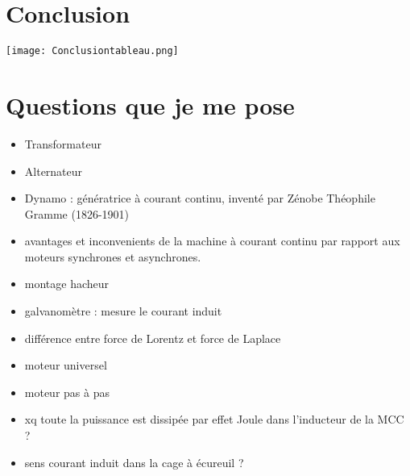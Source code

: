 \documentclass{article}
\begin{document}
\section*{Conclusion}

\begin{center}
    \texttt{[image: Conclusiontableau.png]}
\end{center}

\section*{Questions que je me pose}
\begin{itemize}
    \item Transformateur
    \item Alternateur
    \item Dynamo : génératrice à courant continu, inventé par Zénobe Théophile Gramme (1826-1901)
    \item avantages et inconvenients de la machine à courant continu par rapport aux moteurs synchrones et asynchrones.
    \item montage hacheur
    \item galvanomètre : mesure le courant induit
    \item différence entre force de Lorentz et force de Laplace
    \item moteur universel
    \item moteur pas à pas
    \item xq toute la puissance est dissipée par effet Joule dans l'inducteur de la MCC ? 
    \item sens courant induit dans la cage à écureuil ? 
\end{itemize}
\end{document}
